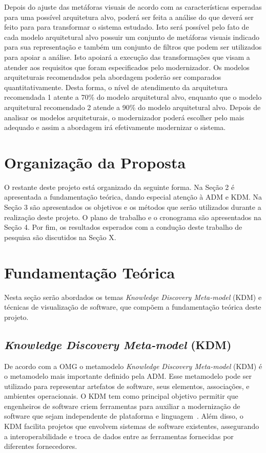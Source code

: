 \documentclass[12pt]{article}
\begin{document}
Depois do ajuste das metáforas visuais de acordo com as características esperadas para uma possível arquitetura alvo, poderá ser feita a análise do que deverá ser feito para para transformar o sistema estudado. Isto será possível pelo fato de cada modelo arquitetural alvo possuir um conjunto de metáforas visuais indicado para sua representação e também um conjunto de filtros que podem ser utilizados para apoiar a análise. Isto apoiará a execução das transformações que visam a atender aos requisitos que foram especificados pelo modernizador. Os modelos arquiteturais recomendados pela abordagem poderão ser comparados quantitativamente. Desta forma, o nível de atendimento da arquitetura recomendada 1 atente a 70\% do modelo arquitetural alvo, enquanto que o modelo arquitetural recomendado 2 atende a 90\% do modelo arquitetural alvo. Depois de analisar os modelos arquiteturais, o modernizador poderá escolher pelo mais adequado e assim a abordagem irá efetivamente modernizar o sistema. 

\section{Organização da Proposta}

O restante deste projeto está organizado da seguinte forma. Na Seção 2 é apresentada a fundamentação teórica, dando especial atenção à ADM e KDM. Na Seção 3 são apresentados os objetivos e os métodos que serão utilizados durante a realização deste projeto. O plano de trabalho e o cronograma são apresentados na Seção 4. Por fim, os resultados esperados com a condução deste trabalho de pesquisa são discutidos na Seção X. 

\section{Fundamentação Teórica}
 Nesta seção serão abordados os temas \textit{Knowledge Discovery Meta-model} (KDM) e técnicas de visualização de software, que compõem a fundamentação teórica deste projeto.
 
\subsection{\textit{Knowledge Discovery Meta-model} (KDM)}

De acordo com a OMG o metamodelo \textit{Knowledge Discovery Meta-model} (KDM) é o metamodelo mais importante definido pela ADM. Esse metamodelo pode ser utilizado para representar artefatos de software, seus elementos, associações, e ambientes operacionais. O KDM tem como principal objetivo permitir que engenheiros de software criem ferramentas para auxiliar a modernização de software que sejam independente de plataforma e linguagem~\cite{PerezCastillo:2011jo, ADMCHAPTERR}. Além disso, o KDM facilita projetos que envolvem sistemas de software existentes, assegurando a interoperabilidade e troca de dados entre as ferramentas fornecidas por diferentes fornecedores. 
\end{document}
